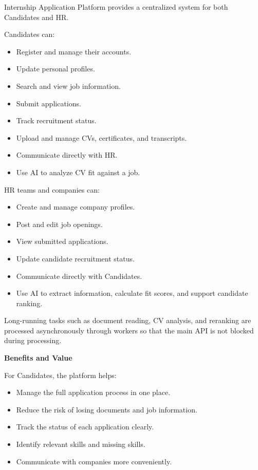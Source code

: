 Internship Application Platform provides a centralized system for both
Candidates and HR.

Candidates can:

\begin{itemize}
\tightlist
\item
  Register and manage their accounts.
\item
  Update personal profiles.
\item
  Search and view job information.
\item
  Submit applications.
\item
  Track recruitment status.
\item
  Upload and manage CVs, certificates, and transcripts.
\item
  Communicate directly with HR.
\item
  Use AI to analyze CV fit against a job.
\end{itemize}

HR teams and companies can:

\begin{itemize}
\tightlist
\item
  Create and manage company profiles.
\item
  Post and edit job openings.
\item
  View submitted applications.
\item
  Update candidate recruitment status.
\item
  Communicate directly with Candidates.
\item
  Use AI to extract information, calculate fit scores, and support
  candidate ranking.
\end{itemize}

Long-running tasks such as document reading, CV analysis, and reranking
are processed asynchronously through workers so that the main API is not
blocked during processing.

\vspace{0.5em}\noindent\textbf{Benefits and Value}\par

For Candidates, the platform helps:

\begin{itemize}
\tightlist
\item
  Manage the full application process in one place.
\item
  Reduce the risk of losing documents and job information.
\item
  Track the status of each application clearly.
\item
  Identify relevant skills and missing skills.
\item
  Communicate with companies more conveniently.
\end{itemize}

